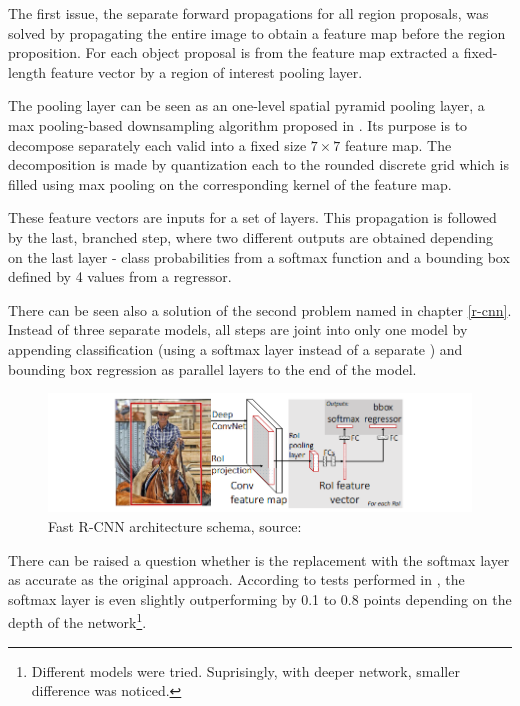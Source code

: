 The first issue, the separate forward propagations for all region proposals, was solved by propagating the entire image to obtain a feature map before the region proposition. For each object proposal is from the feature map extracted a fixed-length feature vector by a region of interest  pooling layer.

The  pooling layer can be seen as an one-level spatial pyramid pooling layer, a max pooling-based downsampling algorithm proposed in \cite{spp}. Its purpose is to decompose separately each valid  into a fixed size $7 \times 7$ feature map. The decomposition is made by quantization each  to the rounded discrete grid which is filled using max pooling on the corresponding kernel of the feature map.

These feature vectors are inputs for a set of  layers. This propagation is followed by the last, branched step, where two different outputs are obtained depending on the last layer - class probabilities from a softmax function and a bounding box defined by 4 values from a regressor.

There can be seen also a solution of the second problem named in chapter \ref{r-cnn}. Instead of three separate models, all steps are joint into only one model by appending classification (using a softmax layer instead of a separate ) and bounding box regression as parallel layers to the end of the model.

\begin{figure}[H]
   \centering
	\includegraphics[width=.9\linewidth]{./pictures/fastrcnn.png}
	\caption[Fast R-CNN architecture]{Fast R-CNN architecture schema, source: \cite{fast-rcnn}}
      \label{fig:fast-rcnn}
\end{figure}

There can be raised a question whether is the  replacement with the softmax layer as accurate as the original approach. According to tests performed in \cite{fast-rcnn}, the softmax layer is even slightly outperforming  by 0.1 to 0.8  points depending on the depth of the network\footnote{Different models were tried. Suprisingly, with deeper network, smaller  difference was noticed.}.


